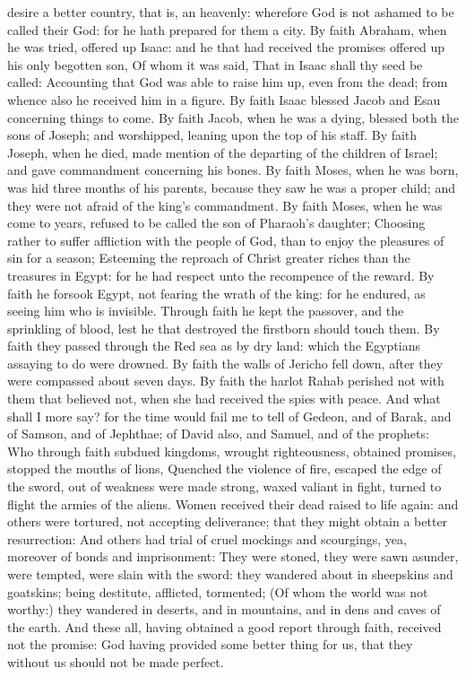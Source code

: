 desire a better country, that is, an heavenly: wherefore God is not
ashamed to be called their God: for he hath prepared for them a city.
 By faith Abraham, when he was tried, offered up Isaac: and
he that had received the promises offered up his only begotten son,
 Of whom it was said, That in Isaac shall thy seed be
called:  Accounting that God was able to raise him up, even
from the dead; from whence also he received him in a figure.
 By faith Isaac blessed Jacob and Esau concerning things to
come.  By faith Jacob, when he was a dying, blessed both
the sons of Joseph; and worshipped, leaning upon the top of his staff.
 By faith Joseph, when he died, made mention of the
departing of the children of Israel; and gave commandment concerning his
bones.  By faith Moses, when he was born, was hid three
months of his parents, because they saw he was a proper child; and they
were not afraid of the king's commandment.  By faith Moses,
when he was come to years, refused to be called the son of Pharaoh's
daughter;  Choosing rather to suffer affliction with the
people of God, than to enjoy the pleasures of sin for a season;
 Esteeming the reproach of Christ greater riches than the
treasures in Egypt: for he had respect unto the recompence of the
reward.  By faith he forsook Egypt, not fearing the wrath
of the king: for he endured, as seeing him who is invisible.
 Through faith he kept the passover, and the sprinkling of
blood, lest he that destroyed the firstborn should touch them.
 By faith they passed through the Red sea as by dry land:
which the Egyptians assaying to do were drowned.  By faith
the walls of Jericho fell down, after they were compassed about seven
days.  By faith the harlot Rahab perished not with them
that believed not, when she had received the spies with peace.
 And what shall I more say? for the time would fail me to
tell of Gedeon, and of Barak, and of Samson, and of Jephthae; of David
also, and Samuel, and of the prophets:  Who through faith
subdued kingdoms, wrought righteousness, obtained promises, stopped the
mouths of lions,  Quenched the violence of fire, escaped
the edge of the sword, out of weakness were made strong, waxed valiant
in fight, turned to flight the armies of the aliens.  Women
received their dead raised to life again: and others were tortured, not
accepting deliverance; that they might obtain a better resurrection:
 And others had trial of cruel mockings and scourgings,
yea, moreover of bonds and imprisonment:  They were stoned,
they were sawn asunder, were tempted, were slain with the sword: they
wandered about in sheepskins and goatskins; being destitute, afflicted,
tormented;  (Of whom the world was not worthy:) they
wandered in deserts, and in mountains, and in dens and caves of the
earth.  And these all, having obtained a good report
through faith, received not the promise:  God having
provided some better thing for us, that they without us should not be
made perfect.

